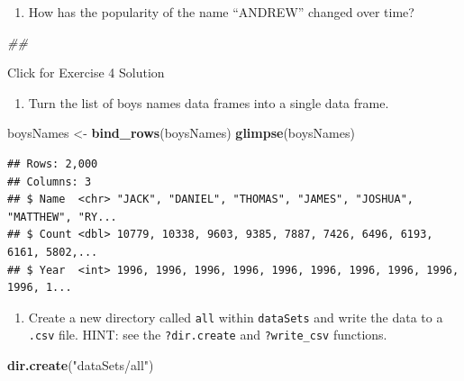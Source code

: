 \documentclass[
]{book}
\newenvironment{Shaded}{\begin{snugshade}}{\end{snugshade}}
\newcommand{\CommentTok}[1]{\textcolor[rgb]{0.56,0.35,0.01}{\textit{#1}}}
\newcommand{\KeywordTok}[1]{\textcolor[rgb]{0.13,0.29,0.53}{\textbf{#1}}}
\newcommand{\NormalTok}[1]{#1}
\newcommand{\StringTok}[1]{\textcolor[rgb]{0.31,0.60,0.02}{#1}}
\providecommand{\tightlist}{%
  \setlength{\itemsep}{0pt}\setlength{\parskip}{0pt}}
\begin{document}
\begin{enumerate}
\def\labelenumi{\arabic{enumi}.}
\setcounter{enumi}{3}
\tightlist
\item
  How has the popularity of the name ``ANDREW'' changed over time?
\end{enumerate}

\begin{Shaded}
\begin{Highlighting}[]
\CommentTok{\#\# }
\end{Highlighting}
\end{Shaded}

{Click for Exercise 4 Solution}

\begin{alert}

\begin{enumerate}
\def\labelenumi{\arabic{enumi}.}
\tightlist
\item
  Turn the list of boys names data frames into a single data frame.
\end{enumerate}

\begin{Shaded}
\begin{Highlighting}[]
\NormalTok{boysNames \textless{}{-}}\StringTok{ }\KeywordTok{bind\_rows}\NormalTok{(boysNames)}
\KeywordTok{glimpse}\NormalTok{(boysNames)}
\end{Highlighting}
\end{Shaded}

\begin{verbatim}
## Rows: 2,000
## Columns: 3
## $ Name  <chr> "JACK", "DANIEL", "THOMAS", "JAMES", "JOSHUA", "MATTHEW", "RY...
## $ Count <dbl> 10779, 10338, 9603, 9385, 7887, 7426, 6496, 6193, 6161, 5802,...
## $ Year  <int> 1996, 1996, 1996, 1996, 1996, 1996, 1996, 1996, 1996, 1996, 1...
\end{verbatim}

\begin{enumerate}
\def\labelenumi{\arabic{enumi}.}
\setcounter{enumi}{1}
\tightlist
\item
  Create a new directory called \texttt{all} within \texttt{dataSets} and write the data to a \texttt{.csv} file. HINT: see the \texttt{?dir.create} and \texttt{?write\_csv} functions.
\end{enumerate}

\begin{Shaded}
\begin{Highlighting}[]
\KeywordTok{dir.create}\NormalTok{(}\StringTok{"dataSets/all"}\NormalTok{)}


\end{Highlighting}
\end{Shaded}
\end{alert}
\end{document}
